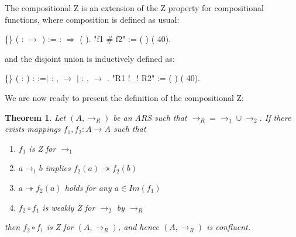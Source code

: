 \documentclass[a4paper]{article}
\newcommand{\tto}{\twoheadrightarrow}
\newtheorem{theorem}{Theorem}[section]
\begin{document}
The compositional Z is an extension of the Z property for
compositional functions, where composition is defined as
usual:

\begin{coqdoccode} \coqdocemptyline \coqdocnoindent
    \{\}
  ( : 
  \ensuremath{\rightarrow} ) := 
  : \ensuremath{\Rightarrow} 
  ( ).\coqdoceol \coqdocnoindent
   "f1 \# f2" := ( 
  ) (  40).\coqdoceol
  \coqdocemptyline
\end{coqdoccode}

\noindent and the disjoint union is inductively defined as:

\begin{coqdoccode}
  \coqdocemptyline \coqdocnoindent {}
   \{\} (
  :  ) : 
   :=\coqdoceol \coqdocnoindent \ensuremath{|}
  : \coqdockw{\ensuremath{\forall}}
   ,  
   \ensuremath{\rightarrow} 
    
  \coqdoceol \coqdocnoindent \ensuremath{|}
  : \coqdockw{\ensuremath{\forall}}
   ,  
   \ensuremath{\rightarrow} 
    
  .\coqdoceol \coqdocnoindent {} "R1
  !\_! R2" := (  )
  (  40).\coqdoceol \coqdocemptyline
  \coqdocemptyline
\end{coqdoccode}

We are now ready to present the definition of the compositional Z:

\begin{theorem}\cite{Nakazawa-Fujita2016}\label{thm:zcomp} Let
  $(A,\to_R)$ be an ARS such that $\to_R = \to_1 \cup \to_2$. If there
  exists mappings $f_1,f_2: A \to A$ such that
  \begin{enumerate} \item $f_1$ is Z for $\to_1$ \item $a \to_1 b$
    implies $f_2(a) \tto f_2(b)$ \item $a \tto f_2(a)$ holds for any
    $a\in Im(f_1)$ \item $f_2 \circ f_1$ is weakly Z for $\to_2$ by
    $\to_R$
  \end{enumerate} then $f_2 \circ f_1$ is Z for
  $(A,\to_R)$, and hence $(A,\to_R)$ is confluent.
\end{theorem}
\end{document}
